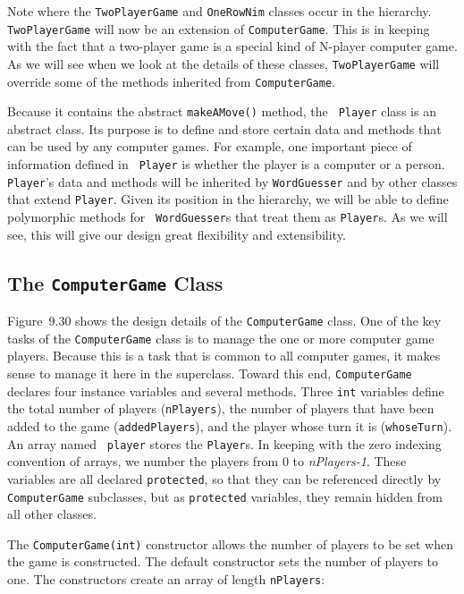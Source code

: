 Note where the {\tt TwoPlayerGame} and {\tt OneRowNim} classes occur
in the hierarchy.  {\tt TwoPlayerGame} will now be an extension of
{\tt ComputerGame}. This is in keeping with the fact that a two-player
game is a special kind of N-player computer game.  As we will see when
we look at the details of these classes, {\tt TwoPlayerGame} will
override some of the methods inherited from {\tt ComputerGame}.

Because it contains the abstract {\tt makeAMove()} method, the {\tt
Player} class is an abstract class.  Its purpose is to define and
store certain data and methods that can be used by any computer
games. For example, one important piece of information defined in {\tt
Player} is whether the player is a computer or a person.  {\tt
Player}'s data and methods will be inherited by {\tt WordGuesser} and
by other classes that extend {\tt Player}.  Given its position in the
hierarchy, we will be able to define polymorphic methods for {\tt
WordGuesser}s that treat them as {\tt Player}s. As we will see, this
will give our design great flexibility and extensibility.

\subsection{The {\tt ComputerGame} Class}

Figure~9.30 shows the design details of the {\tt ComputerGame}
class. One of the key tasks of the {\tt ComputerGame} class is to
manage the one or more computer game players. Because this is a task
that is common to all computer games, it makes sense to manage it here
in the superclass. Toward this end, {\tt ComputerGame} declares four
instance variables and several methods. Three {\tt int} variables
define the total number of players ({\tt nPlayers}), the number of
players that have been added to the game ({\tt addedPlayers}), and the
player whose turn it is ({\tt whoseTurn}).  An array named {\tt
player} stores the {\tt Player}s.  In keeping with the zero indexing
convention of arrays, we number the players from 0 to {\em
nPlayers-1}. These variables are all declared {\tt protected}, so that
they can be referenced directly by {\tt ComputerGame} subclasses, but
as {\tt protected} variables, they remain hidden from all other
classes.

The {\tt ComputerGame(int)} constructor allows the number of players
to be set when the game is constructed.  The default constructor sets
the number of players to one. The constructors create an array of
length {\tt nPlayers}:

